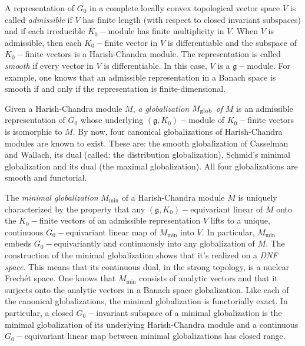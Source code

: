  A representation of $G_{0}$ in a complete locally convex
topological vector space $V$ is called \emph{admissible} if $V$ has finite
length (with respect to closed invariant subspaces) and if each irreducible $%
K_{0}-$module has finite multiplicity in $V$. When $V$ is admissible, then
each $K_{0}-$finite vector in $V$ is differentiable and the subspace of $%
K_{0}-$finite vectors is a Harish-Chandra module. The representation is
called \emph{smooth} if every vector in $V$ is differentiable. In this case,
$V$ is a $\mathfrak{g}-$module. For example, one knows that an admissible
representation in a Banach space is smooth if and only if the representation
is finite-dimensional.

Given a Harish-Chandra module $M$, \emph{a globalization} $M_{%
\text{glob}}$ \emph{of }$M$ is an admissible representation of $G_{0}$ whose
underlying $(\mathfrak{g},K_{0})-$module of $K_{0}-$finite vectors is
isomorphic to $M$. By now, four canonical globalizations of Harish-Chandra
modules are known to exist. These are: the smooth globalization of Casselman
and Wallach, its dual (called: the distribution globalization),
Schmid's minimal globalization and its dual (the maximal
globalization). All four globalizations are smooth and functorial.


The \emph{minimal globalization }$M_{\text{min}}$ of a
Harish-Chandra module $M$ is uniquely characterized by the property that any
$(\mathfrak{g},K_{0})-$equivariant linear of $M$ onto the $K_{0}-$finite
vectors of an admissible representation $V$ lifts to a unique, continuous $%
G_{0}-$equivariant linear map of $M_{\text{min}}$ into $V$. In particular, $%
M_{\text{min}}$ embeds $G_{0}-$equivariantly and continuously into any
globalization of $M$. The construction of the minimal globalization shows
that it's realized on a \emph{DNF space}. This means that its continuous
dual, in the strong topology, is a nuclear Frech\'{e}t space. One knows that
$M_{\text{min}}$ consists of analytic vectors and that it surjects onto the
analytic vectors in a Banach space globalization. Like each of the canonical
globalizations, the minimal globalization is functorially exact. In
particular, a closed $G_{0}-$invariant subspace of a minimal globalization
is the minimal globalization of its underlying Harish-Chandra module and a
continuous $G_{0}-$equivariant linear map between minimal globalizations has
closed range.

